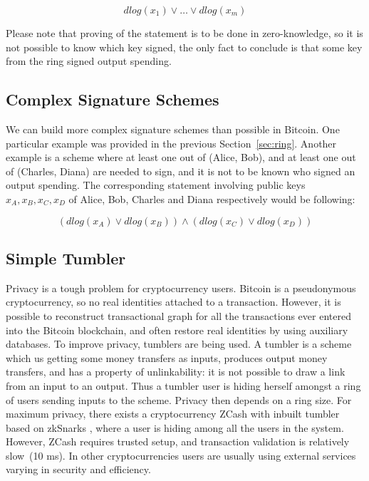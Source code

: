 \documentclass[11pt]{article}
\newcommand{\authnote}[2]{\marginpar{\parbox{\marginparwidth}{\tiny %
  \textsf{#1 {\textcolor{blue}{notes: #2}}}}}%
  \textcolor{blue}{\textbf{\dag}}}
\newcommand{\authnote}[2]{
  \textsf{#1 \textcolor{blue}{: #2}}}
\newcommand{\authnote}[2]{}
\newcommand{\knote}[1]{{\authnote{\textcolor{green}{kushti notes}}{#1}}}
\begin{document}
$$dlog(x_1) \lor \dots \lor dlog(x_m)$$  

Please note that proving of the statement is to be done in zero-knowledge, so it is not possible to know which key signed, the only fact to conclude is that some key from the ring signed output spending. 

\subsection{Complex Signature Schemes}

We can build more complex signature schemes than possible in Bitcoin. One particular example was provided in the previous Section~\ref{sec:ring}. Another example is a scheme where at least one out of (Alice, Bob), and at least one out of (Charles, Diana) are needed to sign, and it is not to be known who signed an output spending. The corresponding statement involving public keys $x_A, x_B, x_C, x_D$ of Alice, Bob, Charles and Diana respectively would be following:

$$(dlog(x_A) \lor dlog(x_B)) \land (dlog(x_C) \lor dlog(x_D))$$

\subsection{Simple Tumbler}
\label{sec:tumbler}

\knote{does the example makes sense? check other tumbler papers. also, update the scripts, now approach is more generic than using tx.outbytes}

Privacy is a tough problem for cryptocurrency users. Bitcoin is a pseudonymous cryptocurrency, so no real identities attached to a transaction. However, it is possible to reconstruct transactional graph for all the transactions ever entered into the Bitcoin blockchain, and often restore real identities by using auxiliary databases. \knote{link} To improve privacy, tumblers are being used. A tumbler is a scheme which us getting some money transfers as inputs, produces output money transfers, and has a property of unlinkability: it is not possible to draw a link from an input to an output. Thus a tumbler user is hiding herself amongst a ring of users sending inputs to the scheme. Privacy then depends on a ring size. For maximum privacy, there exists a cryptocurrency ZCash with inbuilt tumbler based on zkSnarks\knote{links}, where a user is hiding among all the users in the system. However, ZCash requires trusted setup, and transaction validation is relatively slow~(10 ms). In other cryptocurrencies users are usually using external services varying in security and efficiency.
\end{document}
